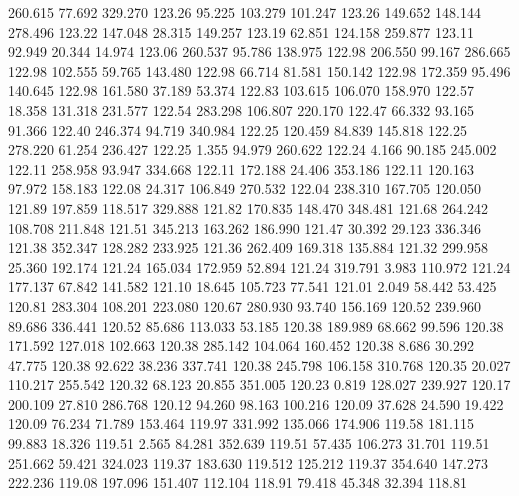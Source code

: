  260.615   77.692  329.270       123.26
  95.225  103.279  101.247       123.26
 149.652  148.144  278.496       123.22
 147.048   28.315  149.257       123.19
  62.851  124.158  259.877       123.11
  92.949   20.344   14.974       123.06
 260.537   95.786  138.975       122.98
 206.550   99.167  286.665       122.98
 102.555   59.765  143.480       122.98
  66.714   81.581  150.142       122.98
 172.359   95.496  140.645       122.98
 161.580   37.189   53.374       122.83
 103.615  106.070  158.970       122.57
  18.358  131.318  231.577       122.54
 283.298  106.807  220.170       122.47
  66.332   93.165   91.366       122.40
 246.374   94.719  340.984       122.25
 120.459   84.839  145.818       122.25
 278.220   61.254  236.427       122.25
   1.355   94.979  260.622       122.24
   4.166   90.185  245.002       122.11
 258.958   93.947  334.668       122.11
 172.188   24.406  353.186       122.11
 120.163   97.972  158.183       122.08
  24.317  106.849  270.532       122.04
 238.310  167.705  120.050       121.89
 197.859  118.517  329.888       121.82
 170.835  148.470  348.481       121.68
 264.242  108.708  211.848       121.51
 345.213  163.262  186.990       121.47
  30.392   29.123  336.346       121.38
 352.347  128.282  233.925       121.36
 262.409  169.318  135.884       121.32
 299.958   25.360  192.174       121.24
 165.034  172.959   52.894       121.24
 319.791    3.983  110.972       121.24
 177.137   67.842  141.582       121.10
  18.645  105.723   77.541       121.01
   2.049   58.442   53.425       120.81
 283.304  108.201  223.080       120.67
 280.930   93.740  156.169       120.52
 239.960   89.686  336.441       120.52
  85.686  113.033   53.185       120.38
 189.989   68.662   99.596       120.38
 171.592  127.018  102.663       120.38
 285.142  104.064  160.452       120.38
   8.686   30.292   47.775       120.38
  92.622   38.236  337.741       120.38
 245.798  106.158  310.768       120.35
  20.027  110.217  255.542       120.32
  68.123   20.855  351.005       120.23
   0.819  128.027  239.927       120.17
 200.109   27.810  286.768       120.12
  94.260   98.163  100.216       120.09
  37.628   24.590   19.422       120.09
  76.234   71.789  153.464       119.97
 331.992  135.066  174.906       119.58
 181.115   99.883   18.326       119.51
   2.565   84.281  352.639       119.51
  57.435  106.273   31.701       119.51
 251.662   59.421  324.023       119.37
 183.630  119.512  125.212       119.37
 354.640  147.273  222.236       119.08
 197.096  151.407  112.104       118.91
  79.418   45.348   32.394       118.81
